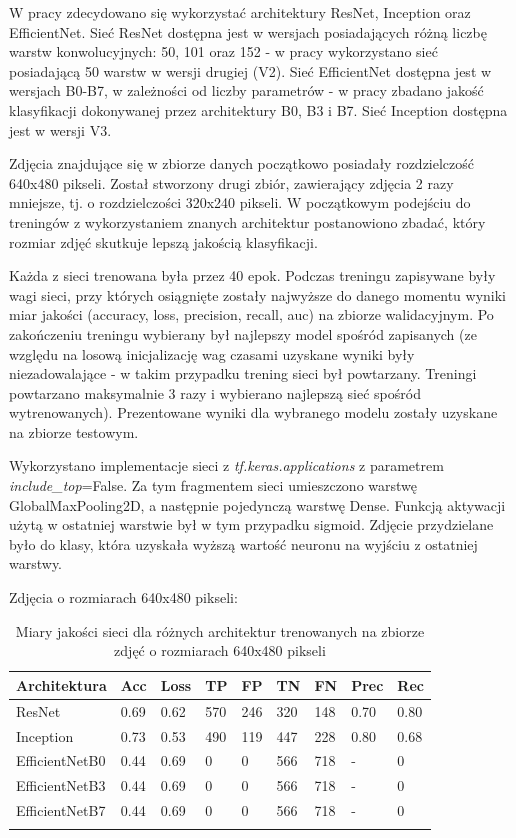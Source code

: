 \documentclass[polish,12pt]{aghthesis}
\begin{document}
\par\noindent W pracy zdecydowano się wykorzystać architektury ResNet, Inception oraz EfficientNet. Sieć ResNet dostępna jest w wersjach posiadających różną liczbę warstw konwolucyjnych: 50, 101 oraz 152 - w pracy wykorzystano sieć posiadającą 50 warstw w wersji drugiej (V2). Sieć EfficientNet dostępna jest w wersjach B0-B7, w zależności od liczby parametrów - w pracy zbadano jakość klasyfikacji dokonywanej przez architektury B0, B3 i B7. Sieć Inception dostępna jest w wersji V3.
\par Zdjęcia znajdujące się w zbiorze danych początkowo posiadały rozdzielczość 640x480 pikseli. Został stworzony drugi zbiór, zawierający zdjęcia 2 razy mniejsze, tj. o rozdzielczości 320x240 pikseli. W początkowym podejściu do treningów z wykorzystaniem znanych architektur postanowiono zbadać, który rozmiar zdjęć skutkuje lepszą jakością klasyfikacji.
\par Każda z sieci trenowana była przez 40 epok. Podczas treningu zapisywane były wagi sieci, przy których osiągnięte zostały najwyższe do danego momentu wyniki miar jakości (accuracy, loss, precision, recall, auc) na zbiorze walidacyjnym. Po zakończeniu treningu wybierany był najlepszy model spośród zapisanych (ze względu na losową inicjalizację wag czasami uzyskane wyniki były niezadowalające - w takim przypadku trening sieci był powtarzany. Treningi powtarzano maksymalnie 3 razy i wybierano najlepszą sieć spośród wytrenowanych). Prezentowane wyniki dla wybranego modelu zostały uzyskane na zbiorze testowym.
\par Wykorzystano implementacje sieci z \textit{tf.keras.applications} z parametrem \textit{include\_top}=False. Za tym fragmentem sieci umieszczono warstwę GlobalMaxPooling2D, a następnie pojedynczą warstwę Dense. Funkcją aktywacji użytą w ostatniej warstwie był w tym przypadku sigmoid. Zdjęcie przydzielane było do klasy, która uzyskała wyższą wartość neuronu na wyjściu z ostatniej warstwy.
\vspace{3mm}
\par\noindent Zdjęcia o rozmiarach 640x480 pikseli:
\renewcommand{\arraystretch}{1.75}
 \begin{longtable}[h!]{|m{2.6cm}|m{1.2cm}|m{1.2cm}|m{1.2cm}|m{1.2cm}|m{1.2cm}|m{1.2cm}|m{1.2cm}|m{1.2cm}|}
 \hline
 Architektura & Acc & Loss & TP & FP & TN & FN & Prec & Rec\\
 \hline
 ResNet & 0.69 & 0.62 & 570 & 246 & 320 & 148 & 0.70 & 0.80\\
 \hline
 Inception & 0.73 & 0.53 & 490 & 119 & 447 & 228 & 0.80 & 0.68\\
 \hline
 EfficientNetB0 & 0.44 & 0.69 & 0 & 0 & 566 & 718 & - & 0\\
 \hline
 EfficientNetB3 & 0.44 & 0.69 & 0 & 0 & 566 & 718 & - & 0\\
 \hline
 EfficientNetB7 & 0.44 & 0.69 & 0 & 0 & 566 & 718 & - & 0\\
 \hline
 \caption{Miary jakości sieci dla różnych architektur trenowanych na zbiorze zdjęć o rozmiarach 640x480 pikseli}
 \label{table:9}
\end{longtable}
\end{document}
